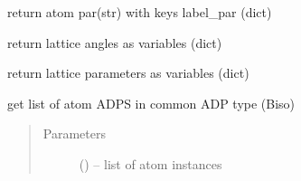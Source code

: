 \documentclass[letterpaper,10pt,english]{sphinxmanual}
\begin{document}
\begin{fulllineitems}
\begin{fulllineitems}
\end{fulllineitems}


\begin{fulllineitems}
\label{\detokenize{rst/structure:mstack.structure.Structure.get_atom_par}}
return atom par(str) with keys label\_par (dict)

\end{fulllineitems}


\begin{fulllineitems}
\label{\detokenize{rst/structure:mstack.structure.Structure.lattice_angles}}
return lattice angles as variables (dict)

\end{fulllineitems}


\begin{fulllineitems}
\label{\detokenize{rst/structure:mstack.structure.Structure.lattice_params}}
return lattice parameters as variables (dict)

\end{fulllineitems}


\begin{fulllineitems}
\label{\detokenize{rst/structure:mstack.structure.Structure.merge_adp}}
get list of atom ADPS in common ADP type (Biso)
\begin{quote}\begin{description}
\item[{Parameters}] \leavevmode
{} (\sphinxstyleliteralemphasis{*}) -- list of atom instances

\end{description}\end{quote}

\end{fulllineitems}



\end{fulllineitems}
\end{document}
